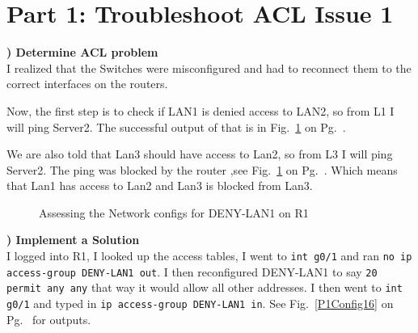 \documentclass{report}
\title{\classinfo}
\author{\semester}
\date{\today}
\newcommand{\mysection}[1]{\section*{#1}}
\newcommand{\mysubsection}[2]{\textbf{\romannumeral #1) #2}}
\begin{document}
\maketitle

\mysection{\textbf{Part 1: Troubleshoot ACL Issue 1}}

\mysubsection{1}{Determine ACL problem}\\
I realized that the Switches were misconfigured and had to reconnect them to
the correct interfaces on the routers.


Now, the first step is to check if LAN1 is denied access to LAN2,
so from L1 I will ping Server2. The successful output of that is in
Fig.~\ref{P1Net16} on Pg.~\pageref{P1Net16}. 


We are also told that Lan3 should have access to Lan2, so 
from L3 I will ping Server2. The ping was blocked by the router
,see Fig.~\ref{P1Net16} on Pg.~\pageref{P1Net16}.
Which means that Lan1 has access to Lan2 and Lan3 is blocked from Lan3. 


\begin{figure}[!hbt]\centering
{}\hfill
{}\par 
\caption{Assessing the Network configs for DENY-LAN1 on R1}\label{P1Net16}
\end{figure}


\noindent\mysubsection{2}{Implement a Solution}\\
I logged into R1, I looked up the access tables, I went to
{\scriptsize{\verb$int g0/1$}\normalsize} and ran
{\scriptsize{\verb$no ip access-group DENY-LAN1 out$}\normalsize}. I then
reconfigured DENY-LAN1 to say 
{\scriptsize{\verb$20 permit any any$}\normalsize} that way it would 
allow all other addresses.  I then went to 
{\scriptsize{\verb$int g0/1$}\normalsize} and typed
in {\scriptsize{\verb$ip access-group DENY-LAN1 in$}\normalsize}. See
Fig.~\ref{P1Config16} on Pg.~\pageref{P1Config16} for outputs.
\end{document}
